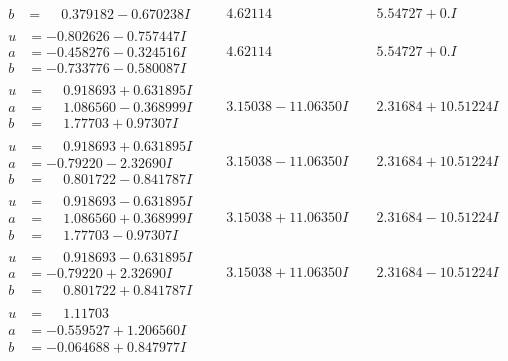 \documentclass[1p]{elsarticle_modified}
\theoremstyle{definition}
\begin{document}
$$\begin{array}{c|c|c}
\begin{aligned}
b &= \phantom{-}0.379182 - 0.670238 I\end{aligned}
 & \phantom{-}4.62114\phantom{ +0.000000I} & \phantom{-}5.54727 + 0. I\phantom{ +0.000000I} \\ \hline\begin{aligned}
u &= -0.802626 - 0.757447 I \\
a &= -0.458276 - 0.324516 I \\
b &= -0.733776 - 0.580087 I\end{aligned}
 & \phantom{-}4.62114\phantom{ +0.000000I} & \phantom{-}5.54727 + 0. I\phantom{ +0.000000I} \\ \hline\begin{aligned}
u &= \phantom{-}0.918693 + 0.631895 I \\
a &= \phantom{-}1.086560 - 0.368999 I \\
b &= \phantom{-}1.77703 + 0.97307 I\end{aligned}
 & \phantom{-}3.15038 - 11.06350 I & \phantom{-}2.31684 + 10.51224 I \\ \hline\begin{aligned}
u &= \phantom{-}0.918693 + 0.631895 I \\
a &= -0.79220 - 2.32690 I \\
b &= \phantom{-}0.801722 - 0.841787 I\end{aligned}
 & \phantom{-}3.15038 - 11.06350 I & \phantom{-}2.31684 + 10.51224 I \\ \hline\begin{aligned}
u &= \phantom{-}0.918693 - 0.631895 I \\
a &= \phantom{-}1.086560 + 0.368999 I \\
b &= \phantom{-}1.77703 - 0.97307 I\end{aligned}
 & \phantom{-}3.15038 + 11.06350 I & \phantom{-}2.31684 - 10.51224 I \\ \hline\begin{aligned}
u &= \phantom{-}0.918693 - 0.631895 I \\
a &= -0.79220 + 2.32690 I \\
b &= \phantom{-}0.801722 + 0.841787 I\end{aligned}
 & \phantom{-}3.15038 + 11.06350 I & \phantom{-}2.31684 - 10.51224 I \\ \hline\begin{aligned}
u &= \phantom{-}1.11703\phantom{ +0.000000I} \\
a &= -0.559527 + 1.206560 I \\
b &= -0.064688 + 0.847977 I\end{aligned}

\end{array}$$
\end{document}
